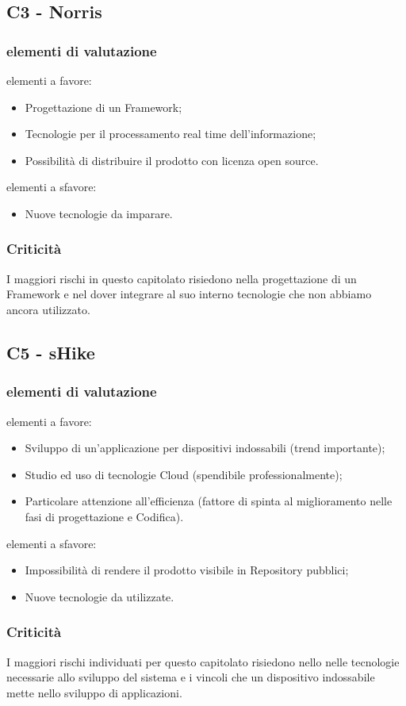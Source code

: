 \subsection{C3 - Norris}{
	\subsubsection{elementi di valutazione}{
		elementi a favore:
		\begin{itemize}
			\item Progettazione di un Framework;
			\item Tecnologie per il processamento real time dell'informazione;
			\item Possibilità di distribuire il prodotto con licenza open source.
		\end{itemize}
		
		elementi a sfavore:
		\begin{itemize}
			\item Nuove tecnologie da imparare.
		\end{itemize}
	}
	\subsubsection{Criticità}{
		I maggiori rischi in questo capitolato risiedono nella progettazione di un Framework e nel dover integrare al suo interno tecnologie che non abbiamo ancora utilizzato.
	}
}

\subsection{C5 - sHike}{
	\subsubsection{elementi di valutazione}{
		elementi a favore:
		\begin{itemize}
			\item Sviluppo di un'applicazione per dispositivi indossabili (trend importante);
			\item Studio ed uso di tecnologie Cloud (spendibile professionalmente);
			\item Particolare attenzione all'efficienza (fattore di spinta al miglioramento nelle fasi di progettazione e Codifica).
		\end{itemize}
		
		elementi a sfavore:
		\begin{itemize}
			\item Impossibilità di rendere il prodotto visibile in Repository pubblici;
			\item Nuove tecnologie da utilizzate.
		\end{itemize}
	}
	\subsubsection{Criticità}{
		I maggiori rischi individuati per questo capitolato risiedono nello nelle tecnologie necessarie allo sviluppo del sistema e i vincoli che un dispositivo indossabile mette nello sviluppo di applicazioni. 
	}
}